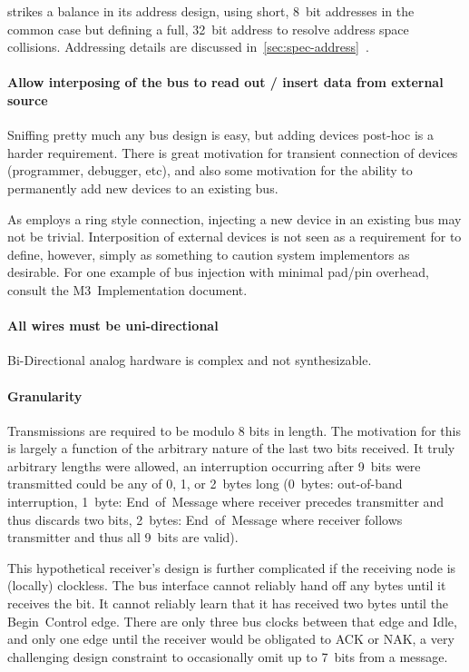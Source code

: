 \bus strikes a balance in its address design, using short, 8~bit addresses in
the common case but defining a full, 32~bit address to resolve address space
collisions. Addressing details are discussed
in~\ref{sec:spec-address}~.

\paragraph{Allow interposing of the bus to read out / insert data from
external source}
Sniffing pretty much any bus design is easy, but adding devices post-hoc is a
harder requirement. There is great motivation for transient connection of
devices (programmer, debugger, etc), and also some motivation for the ability
to permanently add new devices to an existing bus.

As \bus employs a ring style connection, injecting a new device in an existing
bus may not be trivial. Interposition of external devices is not seen as a
requirement for \bus to define, however, simply as something to caution system
implementors as desirable. For one example of bus injection with minimal
pad/pin overhead, consult the M3~Implementation document.

\paragraph{All wires must be uni-directional}
Bi-Directional analog hardware is complex and not synthesizable.

\paragraph{Granularity}
\label{sec:design-granularity}
Transmissions are required to be modulo 8 bits in length. The motivation for
this is largely a function of the arbitrary nature of the last two bits
received. It truly arbitrary lengths were allowed, an interruption occurring
after 9~bits were transmitted could be any of 0, 1, or 2~bytes long
(0~bytes: out-of-band interruption, 1~byte: End~of~Message where receiver
precedes transmitter and thus discards two bits, 2~bytes: End~of~Message where
receiver follows transmitter and thus all 9~bits are valid).

This hypothetical receiver's design is further complicated if the receiving
node is (locally) clockless. The bus interface cannot reliably hand off any
bytes until it receives the \textit{} bit. It cannot reliably learn
that it has received two bytes until the Begin~Control edge. There are only
three bus clocks between that edge and Idle, and only one edge until the
receiver would be obligated to ACK or NAK, a very challenging design
constraint to occasionally omit up to 7~bits from a message.


